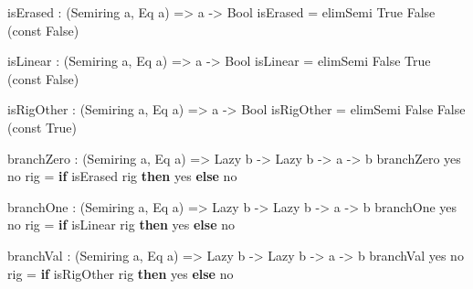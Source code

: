 \documentclass[
]{article}
\newenvironment{Shaded}{}{}
\newcommand{\DataTypeTok}[1]{\textcolor[rgb]{0.56,0.13,0.00}{#1}}
\newcommand{\FunctionTok}[1]{\textcolor[rgb]{0.02,0.16,0.49}{#1}}
\newcommand{\KeywordTok}[1]{\textcolor[rgb]{0.00,0.44,0.13}{\textbf{#1}}}
\newcommand{\NormalTok}[1]{#1}
\newcommand{\OperatorTok}[1]{\textcolor[rgb]{0.40,0.40,0.40}{#1}}
\newcommand{\OtherTok}[1]{\textcolor[rgb]{0.00,0.44,0.13}{#1}}
\begin{document}
\begin{Shaded}
\begin{Highlighting}[]
\NormalTok{isErased }\OperatorTok{:}\NormalTok{ (}\DataTypeTok{Semiring}\NormalTok{ a, }\DataTypeTok{Eq}\NormalTok{ a) }\OtherTok{=\textgreater{}}\NormalTok{ a }\OtherTok{{-}\textgreater{}} \DataTypeTok{Bool}
\NormalTok{isErased }\OtherTok{=}\NormalTok{ elimSemi }\DataTypeTok{True} \DataTypeTok{False}\NormalTok{ (}\FunctionTok{const} \DataTypeTok{False}\NormalTok{)}

\NormalTok{isLinear }\OperatorTok{:}\NormalTok{ (}\DataTypeTok{Semiring}\NormalTok{ a, }\DataTypeTok{Eq}\NormalTok{ a) }\OtherTok{=\textgreater{}}\NormalTok{ a }\OtherTok{{-}\textgreater{}} \DataTypeTok{Bool}
\NormalTok{isLinear }\OtherTok{=}\NormalTok{ elimSemi }\DataTypeTok{False} \DataTypeTok{True}\NormalTok{ (}\FunctionTok{const} \DataTypeTok{False}\NormalTok{)}

\NormalTok{isRigOther }\OperatorTok{:}\NormalTok{ (}\DataTypeTok{Semiring}\NormalTok{ a, }\DataTypeTok{Eq}\NormalTok{ a) }\OtherTok{=\textgreater{}}\NormalTok{ a }\OtherTok{{-}\textgreater{}} \DataTypeTok{Bool}
\NormalTok{isRigOther }\OtherTok{=}\NormalTok{ elimSemi }\DataTypeTok{False} \DataTypeTok{False}\NormalTok{ (}\FunctionTok{const} \DataTypeTok{True}\NormalTok{)}

\NormalTok{branchZero }\OperatorTok{:}\NormalTok{ (}\DataTypeTok{Semiring}\NormalTok{ a, }\DataTypeTok{Eq}\NormalTok{ a) }\OtherTok{=\textgreater{}} \DataTypeTok{Lazy}\NormalTok{ b }\OtherTok{{-}\textgreater{}} \DataTypeTok{Lazy}\NormalTok{ b }\OtherTok{{-}\textgreater{}}\NormalTok{ a }\OtherTok{{-}\textgreater{}}\NormalTok{ b}
\NormalTok{branchZero yes no rig }\OtherTok{=} \KeywordTok{if}\NormalTok{ isErased rig }\KeywordTok{then}\NormalTok{ yes }\KeywordTok{else}\NormalTok{ no}

\NormalTok{branchOne }\OperatorTok{:}\NormalTok{ (}\DataTypeTok{Semiring}\NormalTok{ a, }\DataTypeTok{Eq}\NormalTok{ a) }\OtherTok{=\textgreater{}} \DataTypeTok{Lazy}\NormalTok{ b }\OtherTok{{-}\textgreater{}} \DataTypeTok{Lazy}\NormalTok{ b }\OtherTok{{-}\textgreater{}}\NormalTok{ a }\OtherTok{{-}\textgreater{}}\NormalTok{ b}
\NormalTok{branchOne yes no rig }\OtherTok{=} \KeywordTok{if}\NormalTok{ isLinear rig }\KeywordTok{then}\NormalTok{ yes }\KeywordTok{else}\NormalTok{ no}

\NormalTok{branchVal }\OperatorTok{:}\NormalTok{ (}\DataTypeTok{Semiring}\NormalTok{ a, }\DataTypeTok{Eq}\NormalTok{ a) }\OtherTok{=\textgreater{}} \DataTypeTok{Lazy}\NormalTok{ b }\OtherTok{{-}\textgreater{}} \DataTypeTok{Lazy}\NormalTok{ b }\OtherTok{{-}\textgreater{}}\NormalTok{ a }\OtherTok{{-}\textgreater{}}\NormalTok{ b}
\NormalTok{branchVal yes no rig }\OtherTok{=} \KeywordTok{if}\NormalTok{ isRigOther rig }\KeywordTok{then}\NormalTok{ yes }\KeywordTok{else}\NormalTok{ no}
\end{Highlighting}
\end{Shaded}
\end{document}
